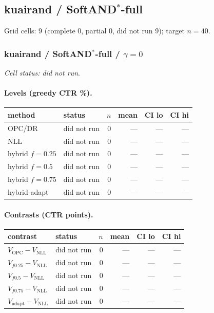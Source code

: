 \documentclass[10pt,a4paper]{article}
\begin{document}
\subsection{kuairand / SoftAND$^*$-full}
Grid cells: 9 (complete 0, partial 0, did not run 9); target $n=40$.
\subsubsection{kuairand / SoftAND$^*$-full / $\gamma=0$}
\emph{Cell status: did not run}.
\paragraph{Levels (greedy CTR \%).}
{\centering\small\begin{tabular}{llrrrr}
\toprule method & status & $n$ & mean & CI lo & CI hi \\
\midrule
OPC/DR & did not run & 0 & --- & --- & --- \\
NLL & did not run & 0 & --- & --- & --- \\
hybrid $f{=}0.25$ & did not run & 0 & --- & --- & --- \\
hybrid $f{=}0.5$ & did not run & 0 & --- & --- & --- \\
hybrid $f{=}0.75$ & did not run & 0 & --- & --- & --- \\
hybrid adapt & did not run & 0 & --- & --- & --- \\
\bottomrule\end{tabular}\par}
\paragraph{Contrasts (CTR points).}
{\centering\small\begin{tabular}{llrrrr}
\toprule contrast & status & $n$ & mean & CI lo & CI hi \\
\midrule
$V_{\mathrm{OPC}}-V_{\mathrm{NLL}}$ & did not run & 0 & --- & --- & --- \\
$V_{f0.25}-V_{\mathrm{NLL}}$ & did not run & 0 & --- & --- & --- \\
$V_{f0.5}-V_{\mathrm{NLL}}$ & did not run & 0 & --- & --- & --- \\
$V_{f0.75}-V_{\mathrm{NLL}}$ & did not run & 0 & --- & --- & --- \\
$V_{\mathrm{adapt}}-V_{\mathrm{NLL}}$ & did not run & 0 & --- & --- & --- \\
\bottomrule\end{tabular}\par}
\bigskip
\end{document}
